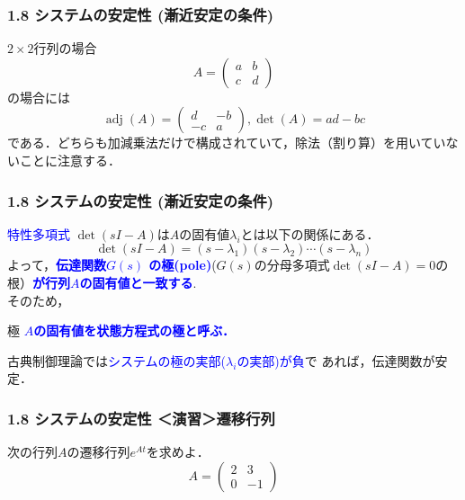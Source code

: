 \documentclass[10pt]{beamer}
\begin{document}
\begin{frame}[t]
\frametitle{1.8 システムの安定性 (漸近安定の条件)}
$2 \times 2$行列の場合
\[
	A= \left(\begin{array}{cc}
		a & b \\
		c & d
	   \end{array} \right )
\]
の場合には
\[
	\operatorname{adj}(A) = 
		\left(\begin{array}{cc}
			d & -b \\
			-c & a
		\end{array} \right )
	,  
	\operatorname{det}(A)= ad -bc
\]
である．どちらも加減乗法だけで構成されていて，除法（割り算）を用いていないことに注意する．
\end{frame}


\begin{frame}[t]
\frametitle{1.8 システムの安定性 (漸近安定の条件)}
\textcolor{blue}{特性多項式}
$\operatorname{det} (s I - A)$は$A$の固有値$\lambda_i$とは以下の関係にある．
\begin{equation}
 \operatorname{det} (s I - A)
  = (s - \lambda_1)(s - \lambda_2)\cdots(s - \lambda_n)
\end{equation}
よって，\textcolor{blue}{\bf 伝達関数$G(s)$
の極(pole)}($G(s)$の分母多項式$\operatorname{det} (s I - A)=0$の根）\textcolor{blue}{\bf が行列$A$の固有値と一致する}.\\
そのため，

\begin{block}{極}
\textcolor{blue}{\bf $A$の固有値を状態方程式の極と呼ぶ．}\\
\end{block}

古典制御理論では\textcolor{blue}{システムの極の実部($\lambda_i$の実部)が負}で
あれば，伝達関数が安定．
\end{frame}


\begin{frame}[t]
\frametitle{1.8 システムの安定性 ＜演習＞遷移行列}
次の行列$A$の遷移行列$e^{At}$を求めよ．
\[
  A= \left(\begin{array}{cc}
    2 & 3 \\
    0 & -1
     \end{array} \right )
\]
\end{frame}
\end{document}
